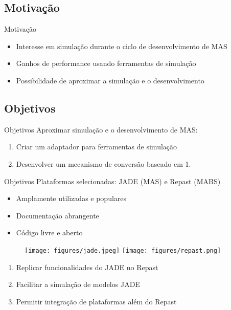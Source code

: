 \subsection{Motivação}
\begin{frame}{Motivação}
	\begin{itemize}
		\item Interesse em simulação durante o ciclo de desenvolvimento de MAS
		\item Ganhos de performance usando ferramentas de simulação
		\item Possibilidade de aproximar a simulação e o desenvolvimento
	\end{itemize}
\end{frame}

\subsection{Objetivos}
\begin{frame}{Objetivos}
	Aproximar simulação e o desenvolvimento de MAS:
	\begin{enumerate}
		\item Criar um adaptador para ferramentas de simulação
		\item Desenvolver um mecanismo de conversão baseado em 1.
	\end{enumerate}
\end{frame}

\begin{frame}{Objetivos}
	Plataformas selecionadas: JADE (MAS) e Repast (MABS)

		\begin{itemize}
			\item Amplamente utilizadas e populares
			\item Documentação abrangente
			\item Código livre e aberto
		\end{itemize}

	\begin{figure}
		\texttt{[image: figures/jade.jpeg]}
		\hspace{1cm}
		\texttt{[image: figures/repast.png]}
	\end{figure}
	\vspace{0.5cm}
	\begin{enumerate}
		\item Replicar funcionalidades do JADE no Repast
		\item Facilitar a simulação de modelos JADE
		\item Permitir integração de plataformas além do Repast
	\end{enumerate}
\end{frame}